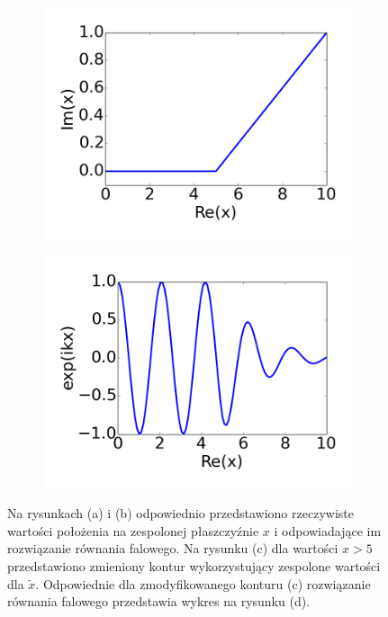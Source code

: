 \begin{figure}[tb]
	\begin{subfigure}{0.45\textwidth}
		\includegraphics[width=\textwidth]{images/pml/complex-x.png}
		\caption{}
		\label{fig:complex-contour}
	\end{subfigure}
	\begin{subfigure}{0.45\textwidth}
		\includegraphics[width=\textwidth]{images/pml/complex-x-wave.png}
		\caption{}
		\label{fig:absorbing-region}
	\end{subfigure}

	\caption{Na rysunkach (a) i (b) odpowiednio przedstawiono rzeczywiste wartości położenia na zespolonej płaszczyźnie $x$ i odpowiadające im rozwiązanie równania falowego. Na rysunku (c) dla wartości $x>5$ przedstawiono zmieniony kontur wykorzystujący zespolone wartości dla $\tilde{x}$. Odpowiednie dla zmodyfikowanego konturu (c)  rozwiązanie równania falowego przedstawia wykres na rysunku (d).}
	\label{fig:var-transform}
\end{figure}


